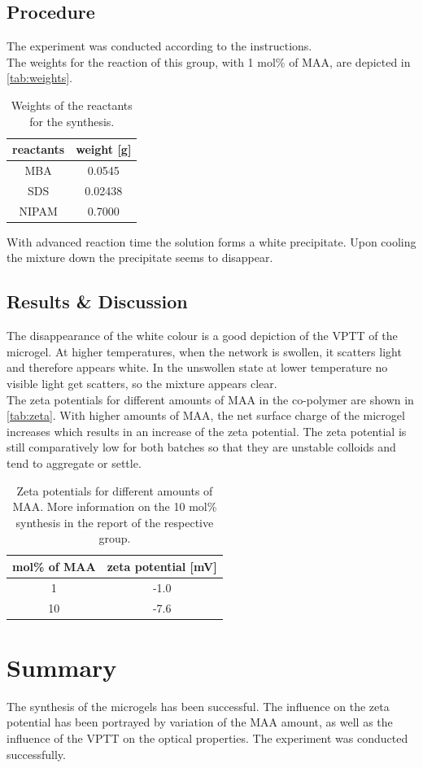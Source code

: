 \documentclass[11pt]{scrreport}
\let\cite=\supercite
\numberwithin{equation}{chapter}
\begin{document}
	\section{Procedure}
	The experiment was conducted according to the instructions.\cite{noauthor_versuchsskript_2026}\\
	The weights for the reaction of this group, with 1 mol\% of MAA, are depicted in \autoref{tab:weights}.
	\begin{table}[H]
		\centering
		\caption{Weights of the reactants for the synthesis.}
		\label{tab:weights}
		\begin{tabular}{|c|c|}
			\hline
			reactants & weight [g] \\
			\hline
			MBA & 0.0545 \\
			\hline
			SDS & 0.02438 \\
			\hline
			NIPAM & 0.7000 \\
			\hline
		\end{tabular}
	\end{table}\noindent
	With advanced reaction time the solution forms a white precipitate. Upon cooling the mixture down the precipitate seems to disappear.\pagebreak
	\section{Results \& Discussion}
	The disappearance of the white colour is a good depiction of the VPTT of the microgel. At higher temperatures, when the network is swollen, it scatters light and therefore appears white. In the unswollen state at lower temperature no visible light get scatters, so the mixture appears clear.\\
	The zeta potentials for different amounts of MAA in the co-polymer are shown in \autoref{tab:zeta}. With higher amounts of MAA, the net surface charge of the microgel increases which results in an increase of the zeta potential. The zeta potential is still comparatively low for both batches so that they are unstable colloids and tend to aggregate or settle.\cite{wyatt_zeta_2019}
	\begin{table}[H]
		\centering
		\caption{Zeta potentials for different amounts of MAA. More information on the 10 mol\% synthesis in the report of the respective group.}
		\label{tab:zeta}
		\begin{tabular}{|c|c|}
			\hline
			mol\% of MAA & zeta potential [mV] \\
			\hline
			1 &  -1.0\\
			\hline
			10 & -7.6\\
			\hline
		\end{tabular}
	\end{table}\noindent
	{\let\clearpage\relax\chapter{Summary}}\noindent
	The synthesis of the microgels has been successful. The influence on the zeta potential has been portrayed by variation of the MAA amount, as well as the influence of the VPTT on the optical properties. The experiment was conducted successfully.
	\listoffigures
	{\let\clearpage\relax\printbibliography}
\end{document}
